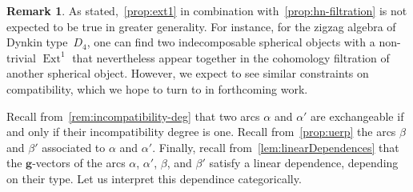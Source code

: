 \documentclass{amsart}
\theoremstyle{definition}
\newtheorem{remark}[theorem]{Remark}
\renewcommand{\b}[1]{{\boldsymbol{#1}}} %
\DeclareMathOperator{\Ext}{Ext} %
\begin{document}
\begin{remark}
  As stated,~\cref{prop:ext1} in combination with~\cref{prop:hn-filtration} is not expected to be true in greater generality.
  For instance, for the zigzag algebra of Dynkin type~\(D_4\), one can find two indecomposable spherical objects with a non-trivial \(\Ext^1\) that nevertheless appear together in the cohomology filtration of another spherical object.
  However, we expect to see similar constraints on compatibility, which we hope to turn to in forthcoming work.
\end{remark}

Recall from~\cref{rem:incompatibility-deg} that two arcs \(\alpha\) and \(\alpha'\) are exchangeable if and only if their incompatibility degree is one.
Recall from~\cref{prop:uerp} the arcs \(\beta\) and \(\beta'\) associated to \(\alpha\) and \(\alpha'\).
Finally, recall from~\cref{lem:linearDependences} that the \(\b{g}\)-vectors of the arcs \(\alpha\), \(\alpha'\), \(\beta\), and \(\beta'\) satisfy a linear dependence, depending on their type.
Let us interpret this dependince categorically.
\end{document}
